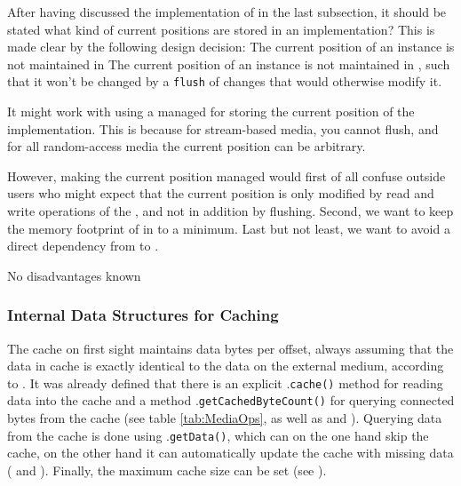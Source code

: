 After having discussed the implementation of \MediumReferenceRepository{} in the last subsection, it should be stated what kind of current positions are stored in an \IMediumAccessor{} implementation? This is made clear by the following design decision:
{%
The current position of an \IMediumAccessor{} instance is not maintained in \MediumReferenceRepository{}
}
{%
The current position of an \IMediumAccessor{} instance is not maintained in \MediumReferenceRepository{}, such that it won't be changed by a \texttt{flush} of changes that would otherwise modify it.
}
{%
It might work with using a managed \IMediumReference{} for storing the current position of the \IMediumAccessor{} implementation. This is because for stream-based media, you cannot flush, and for all random-access media the current position can be arbitrary.

However, making the current position managed would first of all confuse outside users who might expect that the current position is only modified by read and write operations of the \IMediumAccessor{}, and not in addition by flushing. Second, we want to keep the memory footprint of \IMediumReference{} in \MediumReferenceRepository{} to a minimum. Last but not least, we want to avoid a direct dependency from \IMediumAccessor{} to \MediumReferenceRepository{}.
}
{%
No disadvantages known
}


\subsubsection{Internal Data Structures  for Caching}
\label{sec:Datenstrukturen}

The cache on first sight maintains data bytes per offset, always assuming that the data in cache is exactly identical to the data on the external medium, according to . It was already defined that there is an explicit \IMediumStore{}.\texttt{cache()} method for reading data into the cache and a method \IMediumStore{}.\texttt{getCachedByteCount()} for querying connected bytes from the cache (see table \hyperref[tab:MediaOps]{\ref{tab:MediaOps}}, as well as  and ). Querying data from the cache is done using \IMediumStore{}.\texttt{getData()}, which can on the one hand skip the cache, on the other hand it can automatically update the cache with missing data ( and ). Finally, the maximum cache size can be set (see ).

